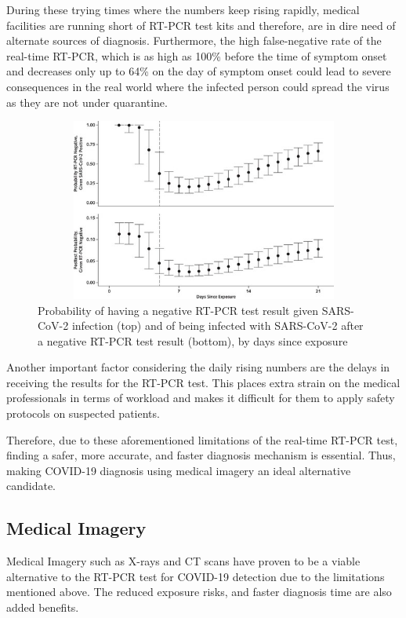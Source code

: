 During these trying times where the numbers keep rising rapidly, medical 
facilities are running short of RT-PCR test kits and therefore, are 
in dire need of alternate sources of diagnosis. Furthermore, 
the high false-negative rate of the real-time RT-PCR, 
which is as high as 100\% before the time of symptom onset 
and decreases only up to 64\% on the day of symptom onset \cite{KLL+2020} could 
lead to severe consequences in the real world where the 
infected person could spread the virus as they are not under quarantine.
\vspace{1em}
\begin{figure}[H]
    \centering
    \includegraphics[width=15cm, height=6cm]{Images/RTPCR.jpg}
    \caption[RT-PCR Test Negative Rate]{Probability of having a negative RT-PCR test result given SARS-CoV-2 infection (top) and of being infected with SARS-CoV-2 after a negative RT-PCR test result (bottom), by days since exposure \cite{KLL+2020}}
    \label{fig:RT-PCR Test Negative Rate}
    \end{figure}
\vspace{-1em}
Another important factor considering the daily rising numbers are the delays in receiving the results for the RT-PCR test. This places extra strain on the medical professionals in terms of workload and makes it difficult for them to apply safety protocols on suspected patients.

Therefore, due to these aforementioned limitations of the real-time RT-PCR test, finding a safer, more accurate, and faster diagnosis mechanism is essential. Thus, making COVID-19 diagnosis using medical imagery an ideal alternative candidate.

\subsection{Medical Imagery} \label{medical imagery}
Medical Imagery such as X-rays and CT scans have proven to be a viable 
alternative to the RT-PCR test for COVID-19 detection 
due to the limitations mentioned above. The reduced exposure risks, and faster 
diagnosis time are also added benefits.

